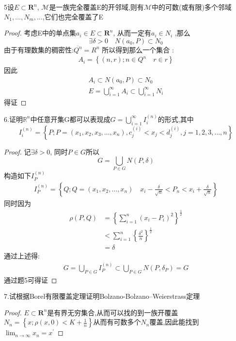 5设\(E \subset \mathbf{R}^n\), \(\mathscr{M}\)是一族完全覆盖E的开邻域,则有\(\mathscr{M}\)中的可数(或有限)多个邻域\(N_1 ,\dots , N_m ,\dots \),它们也完全覆盖了E
\begin{proof}
    考虑E中的单点集\(a_i \in E \subset \mathbf{R}^n\), 从而一定有\( a_i \in N_i \) ,那么
    \[\exists \delta > 0  \quad N(a_0 ,P ) \subset N_0 \]
    由于有理数集的稠密性:\(\overline{Q^n} = R^n\)
    所以得到那么一个集合 : \begin{align*}
        A_i = \left\{(n ,r) ; n \in Q^n \quad r\in r\right\}
    \end{align*}
    因此\begin{align*}
        A_i \subset N ( a_0 , P ) \subset N_0 \\
       E= \bigcup\limits_{i=1}^{\infty} A_i \subset \bigcup\limits_{i=1}^{\infty} N_i
    \end{align*}
    得证
\end{proof}
6.证明\(\mathbb{R}^n\)中任意开集G都可以表现成\(G= \bigcup\limits_{i=1}^{\infty} I_i^{(n)}\)的形式,其中\[I_i^{(n)}=\left\{P ; P = (x_1 , x_2 , x_3 , \dots ,x_n) ,c_j^{(i)}< x_j<d_j^{(i)}, j=1,2,3,\dots , n \right\}\]
\begin{proof}
    记\(\exists \delta > 0 \), 同时\(P \in G \)所以\[G = \bigcup\limits_{P \in G} N(P, \delta)\]
    构造如下\(I^{(n)}_P\)
    \begin{align*}
        I^{(n)}_P = \left\{Q; Q= (x_1, x_2, \dots , x_n) \quad x_i - \frac{\delta}{\sqrt{n}} < P_n < x_i + \frac{\delta}{\sqrt{n}}\right\}
    \end{align*}
    同时因为 
    \begin{align*}
        \rho(P,Q) &= \left\{\sum_{i=1}^{n}(x_i-P_i)^2\right\}^{\frac{1}{2}} \\
        &< \sum_{i=1}^{n} \left\{\frac{\delta^2}{n}\right\}^{\frac{1}{2}}  \\ 
        &= \delta
    \end{align*}
    通过上述得:
    \begin{align*}
        G = \bigcup\limits_{P \in G} I^{(n)}_P \subset \bigcup\limits_{P \in G} N(P,\delta_P) = G 
    \end{align*}
    通过题5可得证
\end{proof}
7.试根据Borel有限覆盖定理证明Bolzano-Bolzano–Weierstrass定理
\begin{proof}
    \(E \subset \mathbf{R}^n\)是有界无穷集合,从而可以找的到一族开覆盖\(N_n = \left\{x ; \rho(x,0) < K +\frac{1}{n}\right\}\)从而有可数多个\(N_n\)覆盖,因此能找到\(\lim_{n\rightarrow \infty }x_n = x^{'}\)
\end{proof}

